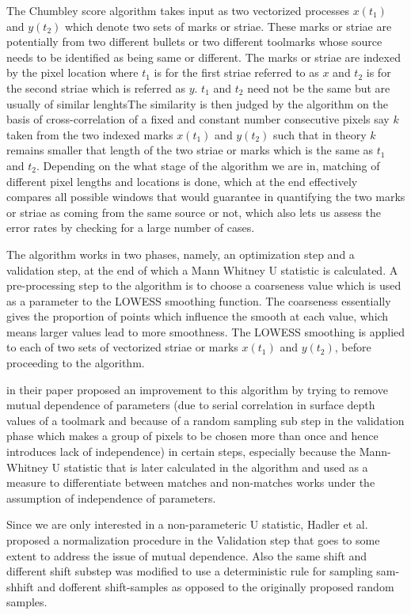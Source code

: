 \documentclass[12pt]{article}
\begin{document}
The Chumbley score algorithm takes input as two vectorized processes
\(x(t_1)\) and \(y(t_2)\) which denote two sets of marks or striae.
These marks or striae are potentially from two different bullets or two
different toolmarks whose source needs to be identified as being same or
different. The marks or striae are indexed by the pixel location where
\(t_1\) is for the first striae referred to as \(x\) and \(t_2\) is for
the second striae which is referred as \(y\). \(t_1\) and \(t_2\) need
not be the same but are usually of similar lenghtsThe similarity is then
judged by the algorithm on the basis of cross-correlation of a fixed and
constant number consecutive pixels say \(k\) taken from the two indexed
marks \(x(t_1)\) and \(y(t_2)\) such that in theory \(k\) remains
smaller that length of the two striae or marks which is the same as
\(t_1\) and \(t_2\). Depending on the what stage of the algorithm we are
in, matching of different pixel lengths and locations is done, which at
the end effectively compares all possible windows that would guarantee
in quantifying the two marks or striae as coming from the same source or
not, which also lets us assess the error rates by checking for a large
number of cases.

The algorithm works in two phases, namely, an optimization step and a
validation step, at the end of which a Mann Whitney U statistic is
calculated. A pre-processing step to the algorithm is to choose a
coarseness value which is used as a parameter to the LOWESS smoothing
function. The coarseness essentially gives the proportion of points
which influence the smooth at each value, which means larger values lead
to more smoothness. The LOWESS smoothing is applied to each of two sets
of vectorized striae or marks \(x(t_1)\) and \(y(t_2)\), before
proceeding to the algorithm.

\citet{hadler} in their paper proposed an improvement to this algorithm
by trying to remove mutual dependence of parameters (due to serial
correlation in surface depth values of a toolmark and because of a
random sampling sub step in the validation phase which makes a group of
pixels to be chosen more than once and hence introduces lack of
independence) in certain steps, especially because the Mann-Whitney U
statistic that is later calculated in the algorithm and used as a
measure to differentiate between matches and non-matches works under the
assumption of independence of parameters.

Since we are only interested in a non-parameteric U statistic, Hadler et
al. proposed a normalization procedure in the Validation step that goes
to some extent to address the issue of mutual dependence. Also the same
shift and different shift substep was modified to use a deterministic
rule for sampling sam-shhift and dofferent shift-samples as opposed to
the originally proposed random samples.
\end{document}
